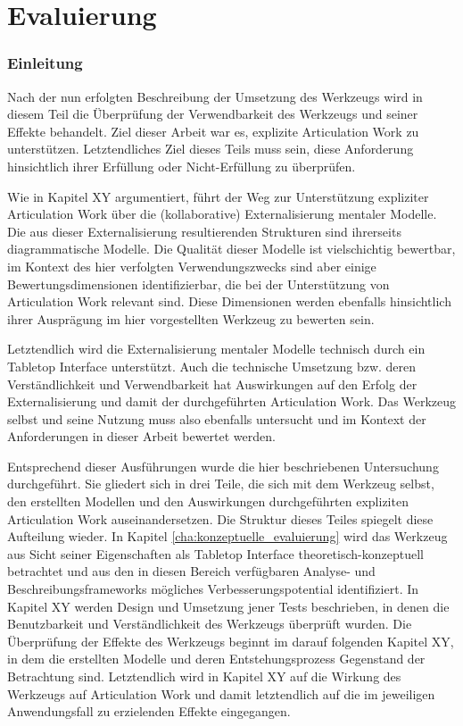 \part{Evaluierung} %
\label{prt:evaluierung}

\section*{Einleitung} %
\label{sec:evaluierung_einleitung}
\thispagestyle{empty}

Nach der nun erfolgten Beschreibung der Umsetzung des Werkzeugs wird in diesem Teil die Überprüfung der Verwendbarkeit des Werkzeugs und seiner Effekte behandelt. Ziel dieser Arbeit war es, explizite Articulation Work zu unterstützen. Letztendliches Ziel dieses Teils muss sein, diese Anforderung hinsichtlich ihrer Erfüllung oder Nicht-Erfüllung zu überprüfen. 

Wie in Kapitel XY argumentiert, führt der Weg zur Unterstützung expliziter Articulation Work über die (kollaborative) Externalisierung mentaler Modelle. Die aus dieser Externalisierung resultierenden Strukturen sind ihrerseits diagrammatische Modelle. Die Qualität dieser Modelle ist vielschichtig bewertbar, im Kontext des hier verfolgten Verwendungszwecks sind aber einige Bewertungsdimensionen identifizierbar, die bei der Unterstützung von Articulation Work relevant sind. Diese Dimensionen werden ebenfalls hinsichtlich ihrer Ausprägung im hier vorgestellten Werkzeug zu bewerten sein. 

Letztendlich wird die Externalisierung mentaler Modelle technisch durch ein Tabletop Interface unterstützt. Auch die technische Umsetzung bzw. deren Verständlichkeit und Verwendbarkeit hat Auswirkungen auf den Erfolg der Externalisierung und damit der durchgeführten Articulation Work. Das Werkzeug selbst und seine Nutzung muss also ebenfalls untersucht und im Kontext der Anforderungen in dieser Arbeit bewertet werden. 

Entsprechend dieser Ausführungen wurde die hier beschriebenen Untersuchung durchgeführt. Sie gliedert sich in drei Teile, die sich mit dem Werkzeug selbst, den erstellten Modellen und den Auswirkungen durchgeführten expliziten Articulation Work auseinandersetzen. Die Struktur dieses Teiles spiegelt diese Aufteilung wieder. In Kapitel \ref{cha:konzeptuelle_evaluierung} wird das Werkzeug aus Sicht seiner Eigenschaften als Tabletop Interface theoretisch-konzeptuell betrachtet und aus den in diesen Bereich verfügbaren Analyse- und Beschreibungsframeworks mögliches Verbesserungspotential identifiziert. In Kapitel XY werden Design und Umsetzung jener Tests beschrieben, in denen die Benutzbarkeit und Verständlichkeit des Werkzeugs überprüft wurden. Die Überprüfung der Effekte des Werkzeugs beginnt im darauf folgenden Kapitel XY, in dem die erstellten Modelle und deren Entstehungsprozess Gegenstand der Betrachtung sind. Letztendlich wird in Kapitel XY auf die Wirkung des Werkzeugs auf Articulation Work und damit letztendlich auf die im jeweiligen Anwendungsfall zu erzielenden Effekte eingegangen.









